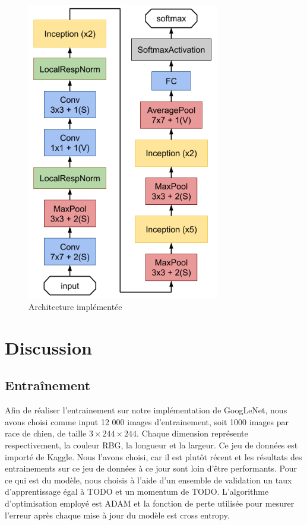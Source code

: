 \documentclass{article}
\begin{document}
\begin{figure}[htbp]
    \includegraphics[width=8.4cm]{./figures/Figure7bis.png} 
    \caption{Architecture implémentée}
    \label{8} 
\end{figure} 

\section{Discussion}

\subsection{Entraînement}
Afin de réaliser l’entrainement sur notre implémentation de GoogLeNet, nous
avons choisi comme input 12 000 images d’entrainement, soit 1000 images par race
de chien, de taille $3\times 244 \times 244$. Chaque dimension représente
respectivement, la couleur RBG, la longueur et la largeur. Ce jeu de données est
importé de Kaggle. Nous l’avons choisi, car il est plutôt récent et les
résultats des entrainements sur ce jeu de données à ce jour sont loin d’être
performants. Pour ce qui est du modèle, nous choisis à l’aide d’un ensemble de
validation un taux d’apprentissage égal à TODO et un momentum de TODO.
L’algorithme d’optimisation employé est ADAM et la fonction de perte utilisée
pour mesurer l’erreur après chaque mise à jour du modèle est cross entropy.
\end{document}
